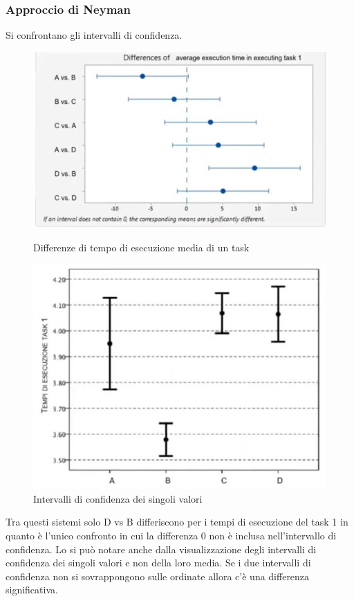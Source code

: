 \documentclass[11pt,a4paper]{book}
\begin{document}
\subsubsection{Approccio di Neyman}
Si confrontano gli intervalli di confidenza.
\begin{figure}[h!]
	\begin{center}
		\includegraphics[scale=0.6]{img/026.jpg}
		\caption{Differenze di tempo di esecuzione media di un task}
		\label{fig: 026}
	\end{center}
	\begin{center}
		\includegraphics[scale=0.6]{img/027.jpg}
		\caption{Intervalli di confidenza dei singoli valori}
		\label{fig: 027}
	\end{center}
\end{figure}
Tra questi sistemi solo D vs B differiscono per i tempi di esecuzione del task 1 in quanto è l'unico confronto in cui la differenza 0 non è inclusa nell'intervallo di confidenza. Lo si può notare anche dalla visualizzazione degli intervalli di confidenza dei singoli valori e non della loro media. Se i due intervalli di confidenza non si sovrappongono sulle ordinate allora c'è una differenza significativa.
\end{document}

